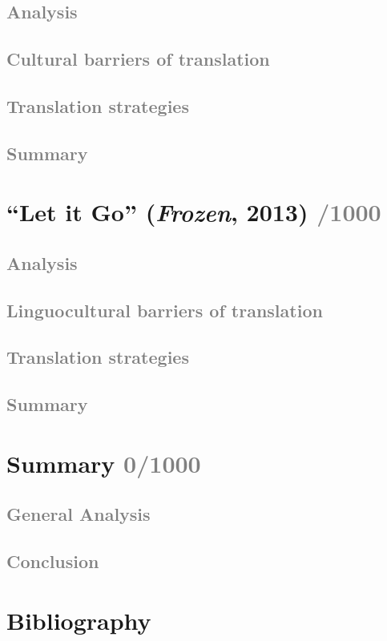 \documentclass[12pt]{article}
\begin{document}
    \subsection{\textcolor{gray}{Analysis}}
    \vspace{12em}
    \subsection{\textcolor{gray}{Cultural barriers of translation}}
    \vspace{12em}
    \subsection{\textcolor{gray}{Translation strategies}}
    \vspace{12em}
    \subsection{\textcolor{gray}{Summary}}
    
\newpage\section{“Let it Go” (\textit{Frozen}, 2013) \textcolor{gray}{/1000}}

    \subsection{\textcolor{gray}{Analysis}}
    \vspace{12em}
    \subsection{\textcolor{gray}{Linguocultural barriers of translation}}
    \vspace{12em}
    \subsection{\textcolor{gray}{Translation strategies}}
    \vspace{12em}
    \subsection{\textcolor{gray}{Summary}}

\newpage\section{Summary \textcolor{gray}{0/1000}}

    \subsection{\textcolor{gray}{General Analysis}}
    \vspace{12em}
    \subsection{\textcolor{gray}{Conclusion}}

\newpage
\section{Bibliography}
%
%
\end{document}
